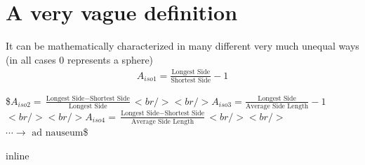 \documentclass[letterpaper,10pt,english]{sphinxmanual}
\begin{document}
\section{A very vague definition}
\label{\detokenize{06-ShapeAnalysis:a-very-vague-definition}}
\sphinxAtStartPar
It can be mathematically characterized in many different very much unequal ways (in all cases 0 represents a sphere)
\begin{equation*}
\begin{split} A_{iso1} = \frac{\text{Longest Side}}{\text{Shortest Side}} - 1 \end{split}
\end{equation*}
\sphinxAtStartPar

\$\( A_{iso2} = \frac{\text{Longest Side}-\text{Shortest Side}}{\text{Longest Side}} \)\(
<br/><br/>
\)\( A_{iso3} = \frac{\text{Longest Side}}{\text{Average Side Length}} - 1 \)\(
<br/><br/>
\)\( A_{iso4} = \frac{\text{Longest Side}-\text{Shortest Side}}{\text{Average Side Length}} \)\(
<br/><br/>
\)\( \cdots \rightarrow \text{ ad nauseum} \)\$

\begin{sphinxVerbatim}[commandchars=\\\{\}]
   
   
   
   
   
 inline
\end{sphinxVerbatim}
\end{document}
